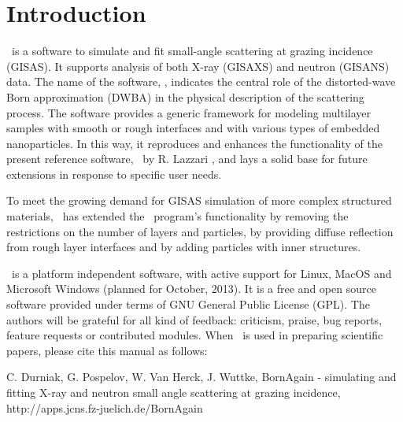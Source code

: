 \newpage
\chapter*{Introduction}


\BornAgain\ is a  software to simulate and fit small-angle
scattering at grazing incidence (GISAS). 
It supports analysis of both  X-ray (GISAXS) and neutron (GISANS) data.
The name of the software,
\BornAgain , indicates the central role of the distorted-wave Born
approximation (DWBA) in the physical description of the
scattering process. The software provides a generic framework for modeling multilayer samples with smooth or
rough interfaces and with various types of embedded nano\-particles. In this way, it reproduces and enhances the
functionality of the present reference software, \IsGISAXS\ by
R. Lazzari \cite{Lazzari:vi0158}, and lays a solid base for future
extensions in response to specific user needs. 

To meet the growing demand for GISAS simulation of more
complex structured materials, \BornAgain\ has extended the \IsGISAXS\ program’s functionality by removing the
restrictions on the number of layers and particles, by providing diffuse reflection from rough layer interfaces and
by adding particles with inner structures.

\BornAgain\ is a platform independent software, with active support for Linux, MacOS and 
Microsoft Windows (planned for October, 2013). 
It is a free and open source software provided under terms
of GNU General Public License (GPL). The authors will be grateful for all kind of
feedback: criticism, praise, bug reports, feature requests or contributed modules.
When \BornAgain\ is used in preparing scientific papers,
please cite this manual as follows: 
\begin{center}
C. Durniak, G. Pospelov, W. Van Herck, J. Wuttke, \newline
BornAgain - simulating and fitting X-ray and neutron small angle scattering at grazing incidence, \newline
http://apps.jcns.fz-juelich.de/BornAgain
\end{center}



